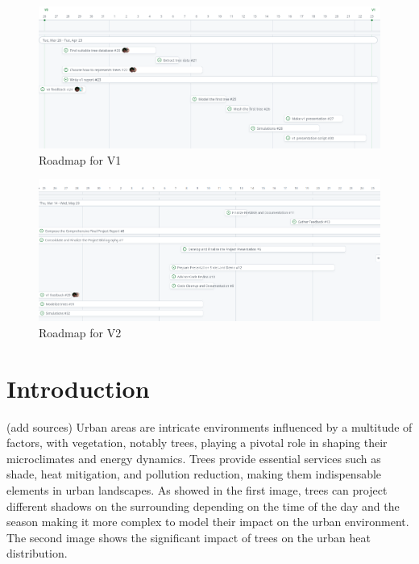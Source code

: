 \documentclass[12pt]{article}
\begin{document}
\begin{figure}[H]
    \centering
    \includegraphics[width=1\textwidth]{images/roadmap_v1.png}
    \caption{Roadmap for V1}
\end{figure}

\begin{figure}[H]
    \centering
    \includegraphics[width=1\textwidth]{images/roadmap_v2.png}
    \caption{Roadmap for V2}
\end{figure}

\newpage

\section{Introduction}
(add sources)
Urban areas are intricate environments influenced by a multitude of factors, with 
vegetation, notably trees, playing a pivotal role in shaping their microclimates 
and energy dynamics. Trees provide essential services such as shade, heat 
mitigation, and pollution reduction, making them indispensable elements in urban 
landscapes. As showed in the first image, trees can project different shadows
on the surrounding depending on the time of the day and the season making it 
more complex to model their impact on the urban environment. The second image
shows the significant impact of trees on the urban heat distribution.
\end{document}
